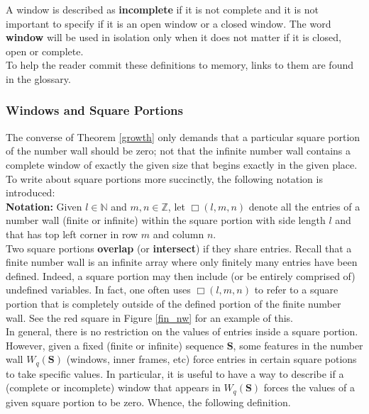 \documentclass{article}
\theoremstyle{definition}
\newcommand{\N}{\mathbb{N}}
\newcommand{\Z}{\mathbb{Z}}
\numberwithin{equation}{subsection}
\begin{document}
 \noindent A window is described as \textbf{incomplete} if it is not complete and it is not important to specify if it is an open window or a closed window. The word \textbf{window} will be used in isolation only when it does not matter if it is closed, open or complete.\\

 \noindent To help the reader commit these definitions to memory, links to them are found in the glossary. 

\subsubsection*{Windows and Square Portions}

\noindent The converse of Theorem \ref{growth} only demands that a particular square portion of the number wall should be zero; not that the infinite number wall contains a complete window of exactly the given size that begins exactly in the given place. To write about square portions more succinctly, the following notation is introduced:\\

\noindent \textbf{\hypertarget{sq_prt}{Notation}:} Given $l\in\N$ and $m,n\in\Z$, let $\Box(l,m,n)$ denote all the entries of a number wall (finite or infinite) within the square portion with side length $l$ and that has top left corner in row $m$ and column $n$.  \\

\noindent Two square portions \textbf{overlap} (or \textbf{intersect}) if they share entries. Recall that a finite number wall is an infinite array where only finitely many entries have been defined. Indeed, a square portion may then include (or be entirely comprised of) undefined variables. In fact, one often uses $\Box(l,m,n)$ to refer to a square portion that is completely outside of the defined portion of the finite number wall. See the red square in Figure \ref{fin_nw} for an example of this.\\

\noindent In general, there is no restriction on the values of entries inside a square portion. However, given a fixed (finite or infinite) sequence $\mathbf{S}$, some features in the number wall $W_q(\mathbf{S})$ (windows, inner frames, etc) force entries in certain square potions to take specific values. In particular, it is useful to have a way to describe if a (complete or incomplete) window that appears in $W_q(\mathbf{S})$ forces the values of a given square portion to be zero. Whence, the following definition.
\end{document}
